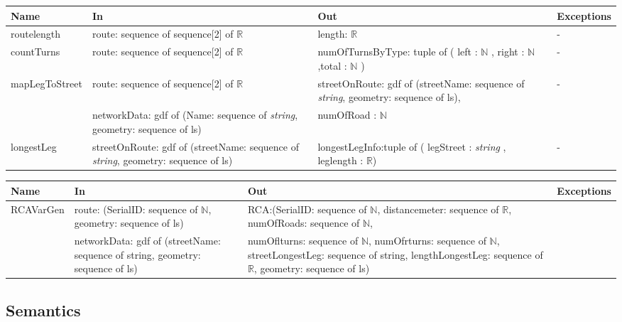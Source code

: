 \documentclass[12pt, titlepage]{article}
\begin{document}
\begin{center}
\begin{tabular}{| l | >{\raggedright}p{4cm} | >{\raggedright}p{4cm} | l |}
\hline
\textbf{Name} & \textbf{In} & \textbf{Out} & \textbf{Exceptions} \\
\hline
routelength & route: sequence of sequence[2] of $\mathbb{R}$ & length: $\mathbb{R}$ & - \\
\hline
countTurns & route: sequence of sequence[2] of $\mathbb{R}$ & numOfTurnsByType: tuple of ( left : $\mathbb{N}$ , right : $\mathbb{N}$,total : $\mathbb{N}$ )& - \\
\hline
mapLegToStreet & route: sequence of sequence[2] of $\mathbb{R}$ & streetOnRoute: gdf of (streetName: sequence of \textit{string}, geometry: sequence of ls),& - \\
 & networkData: gdf of (Name: sequence of \textit{string}, geometry: sequence of ls)& numOfRoad : $\mathbb{N}$ & \\
\hline
longestLeg & streetOnRoute: gdf of (streetName: sequence of \textit{string}, geometry: sequence of ls)  & longestLegInfo:tuple of ( legStreet : \textit{string} , leglength : $\mathbb{R}$) & - \\
\hline
\end{tabular}
\end{center}

\begin{center}
\begin{tabular}{| l | >{\raggedright}p{4cm} | >{\raggedright}p{4cm} | l |}
\hline
\textbf{Name} & \textbf{In} & \textbf{Out} & \textbf{Exceptions} \\
\hline
RCAVarGen & route: (SerialID: sequence of $\mathbb{N}$, geometry: sequence of ls) & RCA:(SerialID: sequence of $\mathbb{N}$, distancemeter: sequence of $\mathbb{R}$, numOfRoads: sequence of $\mathbb{N}$, & \\
 & networkData: gdf of (streetName: sequence of string, geometry: sequence of ls)& numOflturns: sequence of $\mathbb{N}$, numOfrturns: sequence of $\mathbb{N}$, streetLongestLeg: sequence of string, lengthLongestLeg: sequence of $\mathbb{R}$, geometry: sequence of ls) &\\
\hline

\end{tabular}
\end{center}

\subsection{Semantics}
\end{document}
